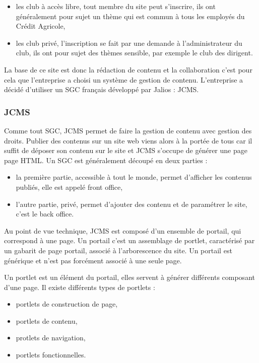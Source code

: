 \documentclass[12pt,a4paper]{article}
\begin{document}
\begin{itemize}
\item les club à accès libre, tout membre du site peut s'inscrire, ils ont généralement pour sujet un thème qui est commun à tous les employés du Crédit Agricole,
\item les club privé, l'inscription se fait par une demande à l'administrateur du club, ils ont pour sujet des thèmes sensible, par exemple le club des dirigent.
\end{itemize} \par 
\bigskip
La base de ce site est donc la rédaction de contenu et la collaboration c'est pour cela que l'entreprise a choisi un système de gestion de contenu. L'entreprise a décidé d'utiliser un SGC français développé par Jalios : JCMS.

\subsubsection{JCMS}
Comme tout SGC, JCMS permet de faire la gestion de contenu avec gestion des droits. Publier des contenus sur un site web viens alors à la portée de tous car il suffit de déposer son contenu sur le site et JCMS s'occupe de générer une page page HTML. Un SGC est généralement découpé en deux parties : 
\begin{itemize}
\item la première partie, accessible à tout le monde, permet d'afficher les contenus publiés, elle est appelé front office,
 \item l'autre partie, privé, permet d'ajouter des contenu et de paramétrer le site, c'est le back office.
\end{itemize}\par
\medskip
Au point de vue technique, JCMS est composé d'un ensemble de portail, qui correspond à une page. Un portail c'est un assemblage de portlet, caractérisé par un gabarit de page portail, associé à l'arborescence du site. Un portail est générique et n'est pas forcément associé à une seule page.\par 
Un portlet est un élément du portail, elles servent à générer différents composant d'une page. Il existe différents types de portlets : 
\begin{itemize}
\item portlets de construction de page,
\item portlets de contenu,
\item protlets de navigation,
\item portlets fonctionnelles.
\end{itemize}
\end{document}
